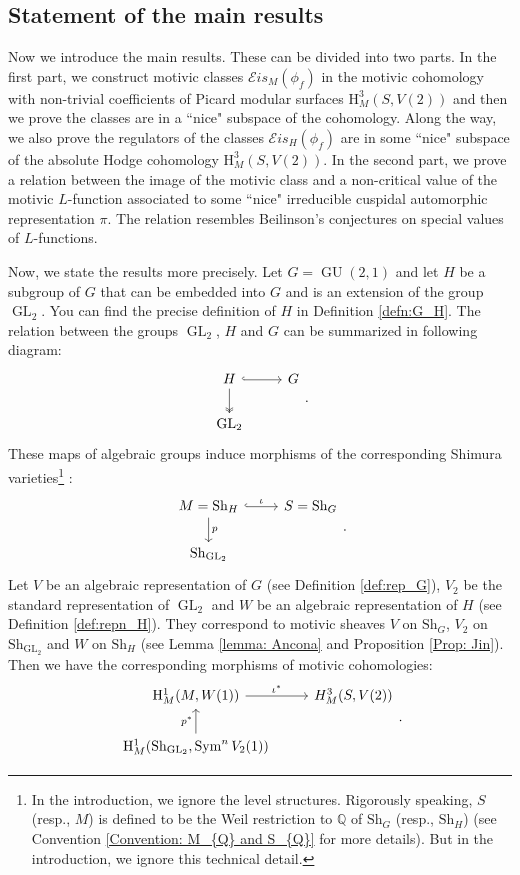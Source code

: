 \documentclass[11pt, a4paper]{amsart}
\theoremstyle{plain}
\theoremstyle{definition}
\numberwithin{equation}{section}
\def\QQ{\mathbb{Q}}
\DeclareMathOperator{\Sym}{Sym}
\DeclareMathOperator{\GU}{GU}
\DeclareMathOperator{\GL}{\mathrm{GL}}
\newcommand{\Sh}{\mathrm{Sh}}
\begin{document}
\subsection{Statement of the main results}

Now we introduce the main results. These can be divided into two parts. In the first part, we construct motivic classes $\mathcal{E}is_{M}(\phi_f)$ in the motivic cohomology with non-trivial coefficients of Picard modular surfaces $\mathrm{H}^{3}_{M}(S, V(2))$ and then we prove the classes are in a ``nice" subspace of the cohomology.  Along the way, we also prove the regulators of the classes $\mathcal{E}is_{H}(\phi_f)$ are in some ``nice" subspace of the absolute Hodge cohomology $\mathrm{H}^{3}_{M}(S, V(2))$. In the second part, we prove a relation between the image of the motivic class and a non-critical value of the motivic $L$-function associated to some ``nice" irreducible cuspidal automorphic representation $\pi$. The relation resembles Beilinson's conjectures on special values of $L$-functions.

\par Now, we state the results more precisely. Let $G = \GU(2, 1)$ and let $H$ be a subgroup of $G$ that can be embedded into $G$ and is an extension of the group $\GL_2$. You can find the precise definition of $H$ in Definition \ref{defn:G_H}. The relation between the groups $\GL_2$, $H$ and $G$ can be summarized in  following diagram: 
\[
    \begin{tikzcd}
        H \ar[r, hook] \ar[d, twoheadrightarrow] & G  \\
        \GL_2  &  
    \end{tikzcd}. 
\]
These maps of algebraic groups induce morphisms of the corresponding Shimura varieties\footnote{In the introduction, we ignore the level structures. Rigorously speaking, $S$ (resp., $M$) is defined to be the Weil restriction to $\QQ$ of $\Sh_{G}$ (resp., $\Sh_{H}$) (see Convention \ref{Convention: M_{Q} and S_{Q}} for more details). But in the introduction, we ignore this technical detail.} : 
\[
    \begin{tikzcd}
        M = \Sh_H \ar[r, hook, "\iota"] \ar[d, rightarrow, "p"] & S=\Sh_G  \\
        \Sh_{\GL_2}  &  
    \end{tikzcd}. 
\]
Let $V$ be an algebraic representation of $G$ (see Definition \ref{def:rep_G}), $V_2$ be the standard representation of $\GL_{2}$ and $W$ be an algebraic representation of $H$ (see Definition \ref{def:repn_H}). They correspond to motivic sheaves $V$ on $\Sh_{G}$, $V_2$ on $\Sh_{\GL_2}$ and $W$ on $\Sh_{H}$ (see Lemma \ref{lemma: Ancona} and Proposition \ref{Prop: Jin}). Then we have the corresponding morphisms of motivic cohomologies: 
\[
    \begin{tikzcd}
        \mathrm{H}_{M}^{1}(M, W(1)) \ar[r, "\iota^{*}"] & H^{3}_{M}(S, V(2))  \\
        \mathrm{H}_{M}^{1}(\Sh_{\GL_2}, \Sym^{n}V_2(1))  \ar[u, "p^{*}"] &  
    \end{tikzcd}. 
\]
\end{document}

